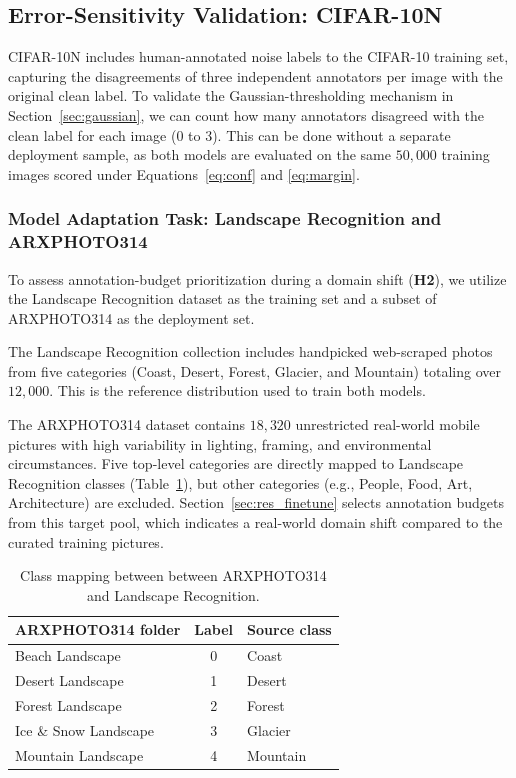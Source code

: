
\subsection{Error-Sensitivity Validation: CIFAR-10N}
\label{sec:cifar10n}

CIFAR-10N includes human-annotated noise labels to the CIFAR-10 training set, 
capturing the disagreements of three independent annotators per image with the 
original clean label. To validate the Gaussian-thresholding mechanism in 
Section~\ref{sec:gaussian}, we can count how many annotators disagreed with 
the clean label for each image (0 to 3). This can be done without a separate 
deployment sample, as both models are evaluated on the same $50,000$ training 
images scored under Equations~\ref{eq:conf} and \ref{eq:margin}.

\subsubsection{Model Adaptation Task: Landscape Recognition and ARXPHOTO314}
\label{sec:target_dataset}
 


To assess annotation-budget prioritization during a domain shift (\textbf{H2}), 
we utilize the Landscape Recognition dataset \cite{utkarsh} as the training set 
and a subset of ARXPHOTO314 \cite{arxnetsa:2025} as the deployment set.

The Landscape Recognition collection includes handpicked web-scraped photos 
from five categories (Coast, Desert, Forest, Glacier, and Mountain) totaling over 
$12,000$. This is the reference distribution used to train both models.

The ARXPHOTO314 dataset contains $18,320$ unrestricted real-world 
mobile pictures with high variability in lighting, framing, and 
environmental circumstances. Five top-level categories are directly 
mapped to Landscape Recognition classes (Table~\ref{tab:classmap}), but other 
categories (e.g., People, Food, Art, Architecture) are excluded. 
Section~\ref{sec:res_finetune} selects annotation budgets from this target pool, 
which indicates a real-world domain shift compared to the curated training pictures.

 
\begin{table}[htbp]
\centering
\caption{Class mapping between between ARXPHOTO314 and Landscape Recognition.}
\label{tab:classmap}
\renewcommand{\arraystretch}{1.25}
\begin{tabular}{@{} l c l @{}}
\toprule
\textbf{ARXPHOTO314 folder} & \textbf{Label} & \textbf{Source class} \\
\midrule
Beach Landscape       & 0 & Coast    \\
Desert Landscape      & 1 & Desert   \\
Forest Landscape      & 2 & Forest   \\
Ice \& Snow Landscape & 3 & Glacier  \\
Mountain Landscape    & 4 & Mountain \\
\bottomrule
\end{tabular}
\end{table}
 
